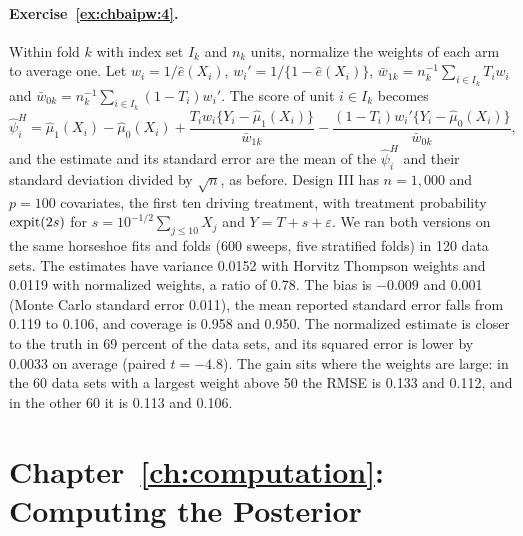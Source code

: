 \paragraph{Exercise~\ref{ex:chbaipw:4}.} Within fold $k$ with index set $I_k$ and $n_k$ units, normalize the weights of each arm to average one. Let $w_i = 1/\hat e(X_i)$, $w_i' = 1/\{1 - \hat e(X_i)\}$, $\bar w_{1k} = n_k^{-1}\sum_{i \in I_k}T_iw_i$ and $\bar w_{0k} = n_k^{-1}\sum_{i \in I_k}(1 - T_i)w_i'$. The score of unit $i \in I_k$ becomes
\[
\hat\psi_i^{H} = \hat\mu_1(X_i) - \hat\mu_0(X_i) + \frac{T_iw_i\{Y_i - \hat\mu_1(X_i)\}}{\bar w_{1k}} - \frac{(1 - T_i)w_i'\{Y_i - \hat\mu_0(X_i)\}}{\bar w_{0k}},
\]
and the estimate and its standard error are the mean of the $\hat\psi_i^{H}$ and their standard deviation divided by $\sqrt n$, as before. Design III has $n = 1{,}000$ and $p = 100$ covariates, the first ten driving treatment, with treatment probability $\operatorname{expit}(2s)$ for $s = 10^{-1/2}\sum_{j \leq 10}X_j$ and $Y = T + s + \varepsilon$. We ran both versions on the same horseshoe fits and folds (600 sweeps, five stratified folds) in 120 data sets. The estimates have variance 0.0152 with Horvitz Thompson weights and 0.0119 with normalized weights, a ratio of 0.78. The bias is $-0.009$ and 0.001 (Monte Carlo standard error 0.011), the mean reported standard error falls from 0.119 to 0.106, and coverage is 0.958 and 0.950. The normalized estimate is closer to the truth in 69 percent of the data sets, and its squared error is lower by 0.0033 on average (paired $t = -4.8$). The gain sits where the weights are large: in the 60 data sets with a largest weight above 50 the RMSE is 0.133 and 0.112, and in the other 60 it is 0.113 and 0.106.

\section*{Chapter~\ref{ch:computation}: Computing the Posterior}


